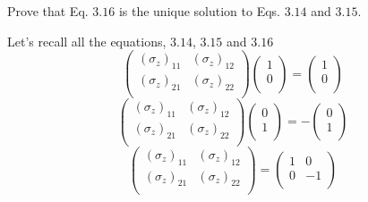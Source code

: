 \documentclass[solutions.tex]{subfiles}
\begin{document}
\maketitle
\begin{exercise}
Prove that Eq. $3.16$ is the unique solution to Eqs. $3.14$ and $3.15$.
\end{exercise}
Let's recall all the equations, $3.14$, $3.15$ and $3.16$
\begin{equation}
	\begin{pmatrix}
		(\sigma_z)_{11} &  (\sigma_z)_{12} \\
		(\sigma_z)_{21} &  (\sigma_z)_{22} \\
	\end{pmatrix}\begin{pmatrix}
		1 \\
		0 \\
	\end{pmatrix} = \begin{pmatrix}
		1 \\
		0 \\
	\end{pmatrix}
\end{equation}
\begin{equation}
	\begin{pmatrix}
		(\sigma_z)_{11} &  (\sigma_z)_{12} \\
		(\sigma_z)_{21} &  (\sigma_z)_{22} \\
	\end{pmatrix}\begin{pmatrix}
		0 \\
		1 \\
	\end{pmatrix} = -\begin{pmatrix}
		0 \\
		1 \\
	\end{pmatrix}
\end{equation}
\begin{equation}
	\begin{pmatrix}
		(\sigma_z)_{11} &  (\sigma_z)_{12} \\
		(\sigma_z)_{21} &  (\sigma_z)_{22} \\
	\end{pmatrix} = \begin{pmatrix}
		1 & 0 \\
		0 & -1 \\
	\end{pmatrix}
\end{equation}
\end{document}
